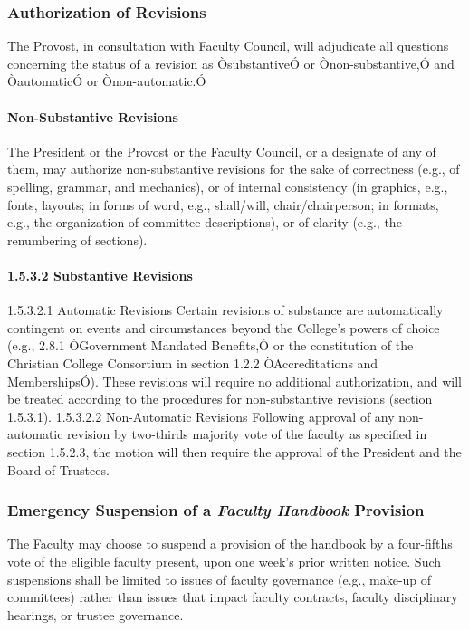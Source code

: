 \documentclass[letterpaper, 11pt]{article}
\begin{document}
		\subsubsection{Authorization of Revisions}
			The Provost, in consultation with Faculty Council, will adjudicate all questions concerning the status of a revision as ÒsubstantiveÓ or Ònon-substantive,Ó and ÒautomaticÓ or Ònon-automatic.Ó
			\paragraph{Non-Substantive Revisions}
				The President or the Provost or the Faculty Council, or a designate of any of them, may authorize non-substantive revisions for the sake of correctness (e.g., of spelling, grammar, and mechanics), or of internal consistency (in graphics, e.g., fonts, layouts; in forms of word, e.g., shall/will, chair/chairperson; in formats, e.g., the organization of committee descriptions), or of clarity (e.g., the renumbering of sections).
			\paragraph{1.5.3.2 Substantive Revisions}
				1.5.3.2.1 Automatic Revisions
				Certain revisions of substance are automatically contingent on events and circumstances beyond the College's powers of choice (e.g., 2.8.1 ÒGovernment Mandated Benefits,Ó or the constitution of the Christian College Consortium in section 1.2.2 ÒAccreditations and MembershipsÓ). These revisions will require no additional authorization, and will be treated according to the procedures for non-substantive revisions (section 1.5.3.1).
				1.5.3.2.2 Non-Automatic Revisions
				Following approval of any non-automatic revision by two-thirds majority vote of the faculty as specified in section 1.5.2.3, the motion will then require the approval of the President and the Board of Trustees.
		\subsubsection{Emergency Suspension of a \emph{Faculty Handbook} Provision}
			The Faculty may choose to suspend a provision of the handbook by a four-fifths vote of the eligible faculty present, upon one week's prior written notice.  Such suspensions shall be limited to issues of faculty governance (e.g., make-up of committees) rather than issues that impact faculty contracts, faculty disciplinary hearings, or trustee governance.
\end{document}
